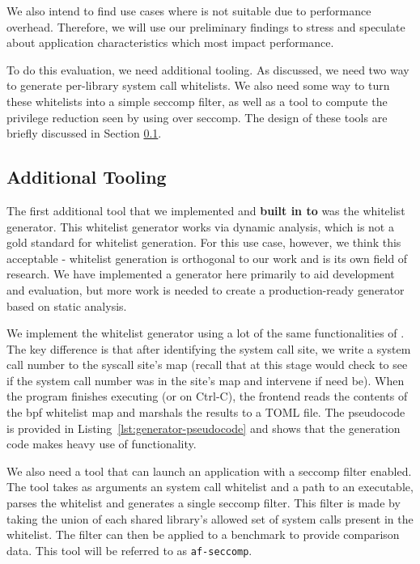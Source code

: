 We also intend to find use cases where \af is not suitable due to performance
overhead. Therefore, we will use our preliminary findings to stress \af and
speculate about application characteristics which most impact performance.

To do this evaluation, we need additional tooling. As discussed, we need two
way to generate per-library system call whitelists. We also need some way to turn
these whitelists into a simple seccomp filter, as well as a tool to compute the
privilege reduction seen by using \af over seccomp. The design of these tools are
briefly discussed in Section \ref{subsubsec:additional-tooling}.

\subsection{Additional Tooling}\label{subsubsec:additional-tooling}

The first additional tool that we implemented and \textbf{built in to \af} was
the whitelist generator. This whitelist generator works via dynamic analysis,
which is not a gold standard for whitelist generation. For this use case,
however, we think this acceptable - whitelist generation is orthogonal to our
work and is its own field of research. We have implemented a generator here
primarily to aid development and evaluation, but more work is needed to create a
production-ready generator based on static analysis.

We implement the whitelist generator using a lot of the same functionalities of
\af. The key difference is that after identifying the system call site, we write a
system call number to the syscall site's map (recall that at this stage \af would
check to see if the system call number was in the site's map and intervene if need
be). When the program finishes executing (or on Ctrl-C), the frontend reads the
contents of the bpf whitelist map and marshals the results to a TOML file.
The pseudocode is provided in Listing~\ref{lst:generator-pseudocode} and shows
that the generation code makes heavy use of \afg functionality.

We also need a tool that can launch an application with a seccomp filter enabled.
The tool takes as arguments an \af system call whitelist
and a path to an executable, parses the whitelist and generates a single
seccomp filter. This filter is made by taking the union of each shared 
library's allowed set of system calls present in the \af whitelist. The filter can
then be applied to a benchmark to provide comparison data. This tool will be
referred to as \texttt{af-seccomp}.

